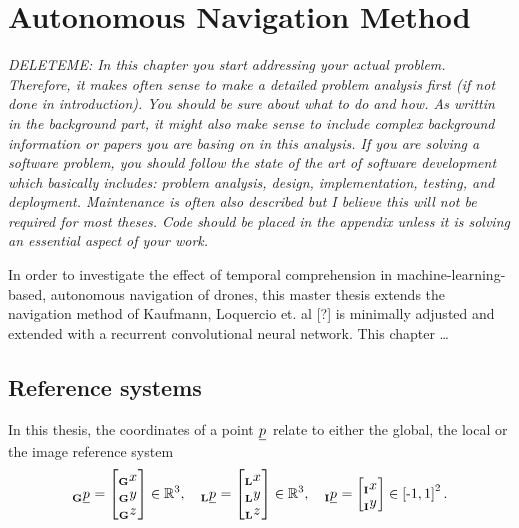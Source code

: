 \chapter{Autonomous Navigation Method}
\label{mainone}
\textit{
DELETEME: In this chapter you start addressing your actual problem. Therefore, it makes often sense to make a detailed problem analysis first (if not done in introduction). You should be sure about what to do and how. As writtin in the background part, it might also make sense to include complex background information or papers you are basing on in this analysis. If you are solving a software problem, you should follow the state of the art of software development which basically includes: problem analysis, design, implementation, testing, and deployment. Maintenance is often also described but I believe this will not be required for most theses. Code should be placed in the appendix unless it is solving an essential aspect of your work.
}





In order to investigate the effect of temporal comprehension in machine-learning-based, autonomous navigation of drones,
this master thesis extends the navigation method of Kaufmann, Loquercio et. al [?] is minimally adjusted and extended with a recurrent convolutional neural network.
This chapter \dots



\section{Reference systems}
In this thesis, the coordinates of a point 
$\pos[]{}{}{}{}$
relate to either the global, the local or the image reference system
\begin{equation}
    \pos[]{}{}{\grs}{} = \begin{bmatrix}
        \x[]{}{}{\grs}{} \\ \y[]{}{}{\grs}{} \\ \z[]{}{}{\grs}{}
    \end{bmatrix} \in \mathbb{R}^3
    ,\quad 
    \pos[]{}{}{\lrs}{} = \begin{bmatrix}
        \x[]{}{}{\lrs}{} \\ \y[]{}{}{\lrs}{} \\ \z[]{}{}{\lrs}{}
    \end{bmatrix} \in \mathbb{R}^3
    ,\quad 
    \pos[]{}{}{\irs}{} = \begin{bmatrix}
        \x[]{}{}{\irs}{} \\ \y[]{}{}{\irs}{}
    \end{bmatrix} \in \left[\text -1, 1\right]^2.
\end{equation}



